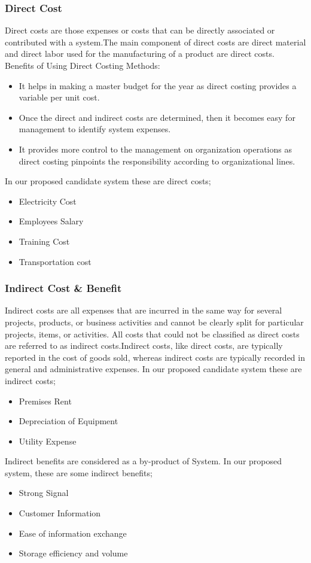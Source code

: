 \begin{spacing}{1}
\subsubsection {Direct Cost }
Direct costs are those expenses or costs that can be directly associated or contributed with a system.The main component of direct costs are direct material and direct labor used for the manufacturing of a product are direct costs. Benefits of Using Direct Costing Methods:
\begin {itemize}
\item It helps in making a master budget for the year as direct costing provides a variable per unit cost.
\item Once the direct and indirect costs are determined, then it becomes easy for management to identify system expenses.
\item It provides more control to the management on organization operations as direct costing pinpoints the responsibility according to organizational lines.
\end {itemize}
 In our proposed candidate system these are direct costs;
\begin {itemize}
\item Electricity Cost
\item Employees Salary
\item Training Cost
\item Transportation cost
\end {itemize}

\subsubsection {Indirect Cost & Benefit }
Indirect costs are all expenses that are incurred in the same way for several projects, products, or business activities and cannot be clearly split for particular projects, items, or activities. All costs that could not be classified as direct costs are referred to as indirect costs.Indirect costs, like direct costs, are typically reported in the cost of goods sold, whereas indirect costs are typically recorded in general and administrative expenses.
In our proposed candidate system these are indirect costs;
\begin {itemize}
\item Premises Rent
\item Depreciation of Equipment
\item Utility Expense
\end {itemize}
Indirect benefits are considered as a by-product of System. In our proposed system, these are some indirect benefits;
\begin {itemize}
\item Strong Signal
\item Customer Information
\item Ease of information exchange
\item Storage efficiency and volume
\end {itemize}


\end{spacing}
